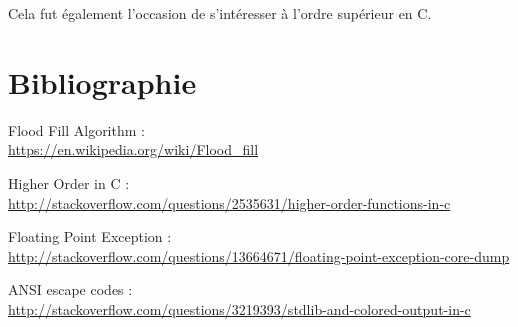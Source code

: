 \documentclass[12pt]{article}
\def\sec#1{\section{#1}}
\begin{document}
Cela fut également l'occasion de s'intéresser à l'ordre supérieur en C.



\sec{Bibliographie}

Flood Fill Algorithm : \\ \url{https://en.wikipedia.org/wiki/Flood_fill}

Higher Order in C : \\ \url{http://stackoverflow.com/questions/2535631/higher-order-functions-in-c}

Floating Point Exception : \\ \url{http://stackoverflow.com/questions/13664671/floating-point-exception-core-dump}

ANSI escape codes : \\ \url{http://stackoverflow.com/questions/3219393/stdlib-and-colored-output-in-c}
\end{document}
